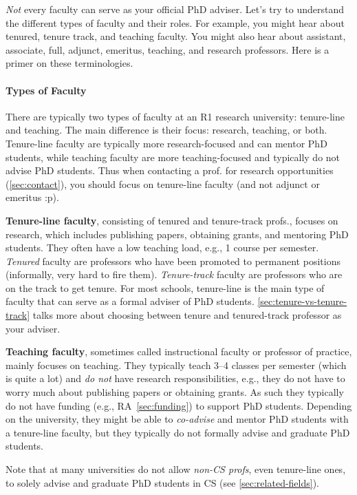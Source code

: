 \documentclass[oneside,11pt,dvipsnames]{book}
\begin{document}
\emph{Not} every faculty can serve as your official PhD adviser. Let's try to understand the different types of faculty and their roles. For example, you might hear about tenured,  tenure track, and teaching faculty.  You might also hear about assistant, associate, full, adjunct, emeritus, teaching, and research professors. Here is a primer on these terminologies.

\paragraph{Types of Faculty} There are typically two types of faculty at an R1 research university: tenure-line and teaching.  The main difference is their focus: research, teaching, or both. Tenure-line faculty are typically more research-focused and can mentor PhD students, while teaching faculty are more teaching-focused and typically do not advise PhD students. Thus when contacting a prof. for research opportunities (\autoref{sec:contact}), you should focus on tenure-line faculty (and not adjunct or emeritus :p).

\textbf{Tenure-line faculty}, consisting of tenured and tenure-track profs., focuses on research, which includes publishing papers, obtaining grants, and mentoring PhD students.  They often have a low teaching load, e.g., 1 course per semester. \emph{Tenured} faculty are professors who have been promoted to permanent positions (informally, very hard to fire them).  \emph{Tenure-track} faculty are professors who are on the track to get tenure.  For most schools, tenure-line is the main type of faculty that can serve as a formal adviser of PhD students. \autoref{sec:tenure-vs-tenure-track} talks more about choosing between tenure and tenured-track professor as your adviser.

\textbf{Teaching faculty}, sometimes called instructional faculty or professor of practice, mainly focuses on teaching. They typically teach 3--4 classes per semester (which is quite a lot) and \emph{do not} have research responsibilities, e.g., they do not have to worry much about publishing papers or obtaining grants. As such they typically do not have funding (e.g., RA~\autoref{sec:funding}) to support PhD students.
Depending on the university, they might be able to \emph{co-advise} and mentor PhD students with a tenure-line faculty, but they typically do not formally advise and graduate PhD students.

Note that at many universities do not allow \emph{non-CS profs}, even tenure-line ones, to solely advise and graduate PhD students in CS (see \autoref{sec:related-fields}). 
\end{document}
